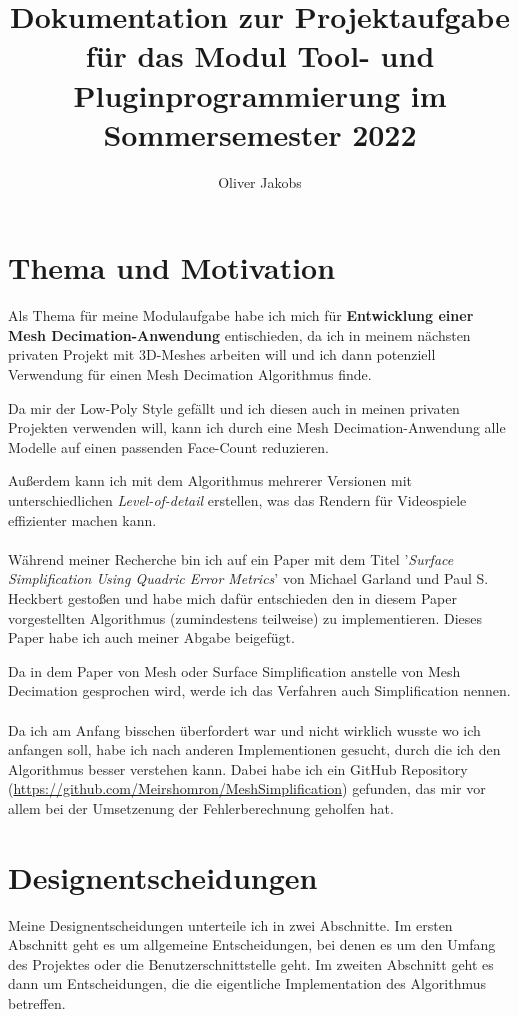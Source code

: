 \documentclass[a4paper,12pt]{article}
\title{Dokumentation zur Projektaufgabe für das Modul Tool- und Pluginprogrammierung im Sommersemester 2022}
\author{Oliver Jakobs}
\begin{document}
\maketitle

\section*{Thema und Motivation}

Als Thema für meine Modulaufgabe habe ich mich für \textbf{Entwicklung einer Mesh Decimation-Anwendung} entischieden, da ich in meinem nächsten privaten Projekt mit 3D-Meshes arbeiten will und ich dann potenziell Verwendung für einen Mesh Decimation Algorithmus finde.

Da mir der Low-Poly Style gefällt und ich diesen auch in meinen privaten Projekten verwenden will, kann ich durch eine Mesh Decimation-Anwendung alle Modelle auf einen passenden Face-Count reduzieren.

Außerdem kann ich mit dem Algorithmus mehrerer Versionen mit unterschiedlichen \emph{Level-of-detail} erstellen, was das Rendern für Videospiele effizienter machen kann.
\\
\\
Während meiner Recherche bin ich auf ein Paper mit dem Titel '\emph{Surface Simplification Using Quadric Error Metrics}' von Michael Garland und Paul S. Heckbert gestoßen und habe mich dafür entschieden den in diesem Paper vorgestellten Algorithmus (zumindestens teilweise) zu implementieren. 
Dieses Paper habe ich auch meiner Abgabe beigefügt.

Da in dem Paper von Mesh oder Surface Simplification anstelle von Mesh Decimation gesprochen wird, werde ich das Verfahren auch Simplification nennen. 
\\
\\
Da ich am Anfang bisschen überfordert war und nicht wirklich wusste wo ich anfangen soll, habe ich nach anderen Implementionen gesucht, durch die ich den Algorithmus besser verstehen kann. Dabei habe ich ein GitHub Repository (\url{https://github.com/Meirshomron/MeshSimplification}) gefunden, das mir vor allem bei der Umsetzenung der Fehlerberechnung geholfen hat.

\newpage

\section*{Designentscheidungen}

Meine Designentscheidungen unterteile ich in zwei Abschnitte. Im ersten Abschnitt geht es um allgemeine Entscheidungen, bei denen es um den Umfang des Projektes oder die Benutzerschnittstelle geht. Im zweiten Abschnitt geht es dann um Entscheidungen, die die eigentliche Implementation des Algorithmus betreffen.
\end{document}
